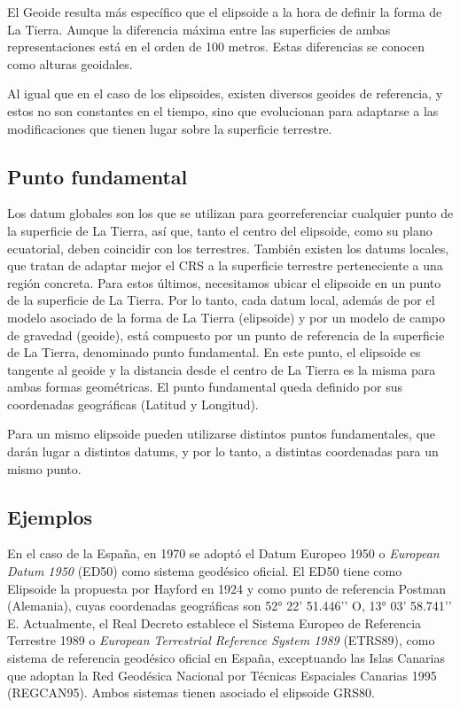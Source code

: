 El Geoide resulta más específico que el elipsoide a la hora de definir la forma de La Tierra. 
Aunque la diferencia máxima entre las superficies de ambas representaciones está en el orden de 100 metros. Estas diferencias se conocen como alturas geoidales.

Al igual que en el caso de los elipsoides, existen diversos geoides de referencia, y estos no son constantes en el tiempo,
sino que evolucionan para adaptarse a las modificaciones que tienen lugar sobre la superficie terrestre.

\subsection{Punto fundamental}

Los datum globales son los que se utilizan para georreferenciar cualquier punto de la superficie de La Tierra, así que, tanto el centro del elipsoide, como su plano ecuatorial, deben coincidir con los terrestres.
También existen los datums locales, que tratan de adaptar mejor el CRS a la superficie terrestre perteneciente a una región concreta.
Para estos últimos, necesitamos ubicar el elipsoide en un punto de la superficie de La Tierra.
Por lo tanto, cada datum local, además de por el modelo asociado de la forma de La Tierra (elipsoide) y por un modelo de campo de gravedad (geoide), está compuesto por un punto de referencia de la superficie de La Tierra,
denominado punto fundamental. En este punto, el elipsoide es tangente al geoide y la distancia desde el centro de La Tierra es la misma para ambas formas geométricas.
El punto fundamental queda definido por sus coordenadas geográficas (Latitud y Longitud). 

Para un mismo elipsoide pueden utilizarse distintos puntos fundamentales, que darán lugar a distintos datums, y por lo tanto, a distintas coordenadas para un mismo punto.

\subsection{Ejemplos}
En el caso de la España, en 1970 se adoptó el Datum Europeo 1950 o \textit{European Datum 1950} (ED50) como sistema geodésico oficial.
El ED50 tiene como Elipsoide la propuesta por Hayford en 1924 y como punto de referencia Postman (Alemania), cuyas coordenadas geográficas son 52° 22’ 51.446’’ O, 13° 03’ 58.741’’ E.
Actualmente, el Real Decreto \cite{BOE2007} establece el Sistema Europeo de Referencia Terrestre 1989 o \textit{European Terrestrial Reference System 1989} (ETRS89), 
como sistema de referencia geodésico oficial en España, exceptuando las Islas Canarias que adoptan la Red Geodésica Nacional por Técnicas Espaciales Canarias 1995 (REGCAN95).
Ambos sistemas tienen asociado el elipsoide GRS80.
  
